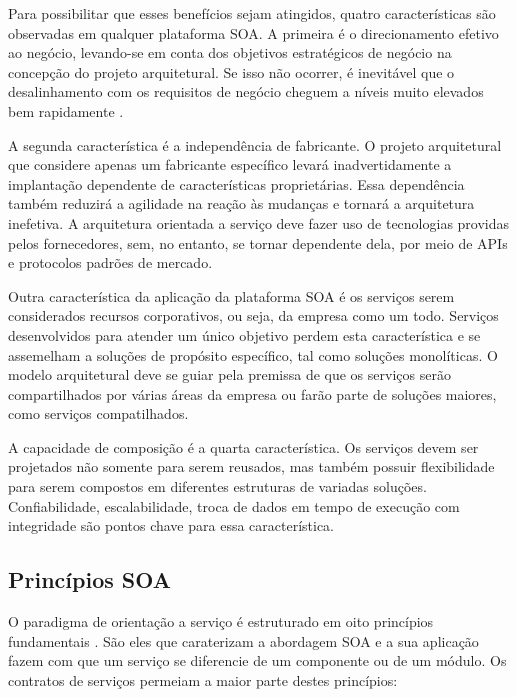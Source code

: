 Para possibilitar que esses benefícios sejam atingidos, quatro características
são observadas em qualquer plataforma SOA. A primeira é o direcionamento
efetivo ao negócio, levando-se em conta dos objetivos estratégicos de negócio na
concepção do projeto arquitetural. Se isso não ocorrer, é inevitável que o
desalinhamento com os requisitos de negócio cheguem a níveis muito elevados
bem rapidamente \cite{erl2008soaDesigPatterns}.

A segunda característica é a independência de fabricante. O projeto arquitetural
que considere apenas um fabricante específico levará inadvertidamente a
implantação dependente de características proprietárias. Essa dependência também
reduzirá a agilidade na reação às mudanças e tornará a arquitetura inefetiva. A
arquitetura orientada a serviço deve fazer uso de tecnologias providas pelos
fornecedores, sem, no entanto, se tornar dependente dela, por meio de APIs e
protocolos padrões de mercado.

Outra característica da aplicação da plataforma SOA é os serviços serem
considerados recursos corporativos, ou seja, da empresa como um todo. Serviços
desenvolvidos para atender um único objetivo perdem esta característica e se
assemelham a soluções de propósito específico, tal como soluções monolíticas. O
modelo arquitetural deve se guiar pela premissa de que os serviços serão
compartilhados por várias áreas da empresa ou farão parte de soluções maiores,
como serviços compatilhados.

A capacidade de composição é a quarta característica. Os serviços devem ser
projetados não somente para serem reusados, mas também possuir
flexibilidade para serem compostos em diferentes estruturas de variadas
soluções. Confiabilidade, escalabilidade, troca de dados em tempo de execução
com integridade são pontos chave para essa característica.



\subsection{Princípios SOA}
\label{PrincipiosSOA} 
\vspace{-6mm}

O paradigma de orientação a serviço é estruturado em oito princípios
fundamentais \cite{erl2009web}. São eles que caraterizam a abordagem SOA e a sua
aplicação fazem com que um serviço se diferencie de um componente ou de
um módulo.
Os contratos de serviços permeiam a maior parte destes princípios:

